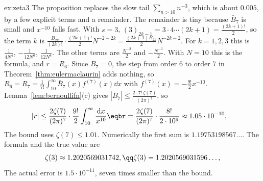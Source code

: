 \begin{solution}{ex:zeta3}
\idea The proposition replaces the slow tail $\sum_{n>10}n^{-3}$, which is about $0.005$, by a few explicit terms and a remainder. The remainder is tiny because $\bar B_7$ is small and $x^{-10}$ falls fast.
\writeup With $s=3$, $(3)_{2k-1}=3\cdot4\cdots(2k+1)=\frac{(2k+1)!}2$, so the term $k$ is $\frac{B_{2k}}{(2k)!}\cdot\frac{(2k+1)!}2N^{-2-2k}=\frac{(2k+1)B_{2k}}2N^{-2k-2}$. For $k=1,2,3$ this is $\frac1{4N^4}$, $-\frac1{12N^6}$, $\frac1{12N^8}$. The other terms are $\frac{N^{-2}}2$ and $-\frac{N^{-3}}2$. With $N=10$ this is the formula, and $r=R_6$. Since $B_7=0$, the step from order $6$ to order $7$ in Theorem~\ref{thm:eulermaclaurin} adds nothing, so $R_6=R_7=\frac1{7!}\int_{10}^\infty\bar B_7(x)f^{(7)}(x)\dd x$ with $f^{(7)}(x)=-\frac{9!}2x^{-10}$. Lemma~\ref{lem:bernoullifn}(c) gives $|\bar B_7|\le\frac{2\cdot7!\,\zeta(7)}{(2\pi)^7}$, so
\[
\begin{aligned}|r|&\le\frac{2\zeta(7)}{(2\pi)^7}\cdot\frac{9!}2\int_{10}^\infty\frac{\mathrm dx}{x^{10}}\eqbr=\frac{2\zeta(7)}{(2\pi)^7}\cdot\frac{8!}{2\cdot10^9}\approx1.05\cdot10^{-10},\end{aligned}
\]
The bound uses $\zeta(7)\le1.01$. Numerically the first sum is $1.19753198567\ldots$. The formula and the true value are
\[
\begin{gathered}\zeta(3)\approx1.2020569031742,\qq\zeta(3)=1.2020569031596\ldots,\end{gathered}
\]
The actual error is $1.5\cdot10^{-11}$, seven times smaller than the bound.
\end{solution}

